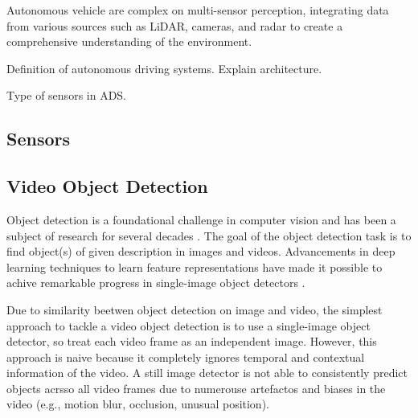 
Autonomous vehicle are complex on multi-sensor perception, integrating data from various sources such as LiDAR, cameras, and radar to create a comprehensive understanding of the environment.

Definition of autonomous driving systems. Explain architecture.

Type of sensors in ADS.

\subsection{Sensors} \label{Background:Sensors}



\subsection{Video Object Detection} \label{Background:VideoObjectDetection}


Object detection is a foundational challenge in computer vision and has been a subject of research for several decades \cite{fischlerRepresentationMatchingPictorial1973}. The goal of the object detection task is to find object(s) of given description in images and videos. Advancements in deep learning techniques to learn feature representations \cite{hintonReducingDimensionalityData2006, lecunDeepLearning2015} have made it possible to achive remarkable progress in single-image object detectors \cite{girshickRichFeatureHierarchies2014a}.


Due to similarity beetwen object detection on image and video, the simplest approach to tackle a video object detection is to use a single-image object detector, so treat each video frame as an independent image. However, this approach is naive because it completely ignores temporal and contextual information of the video. A still image detector is not able to consistently predict objects acrsso all video frames due to numerouse artefactos and biases in the video (e.g., motion blur, occlusion, unusual position).



